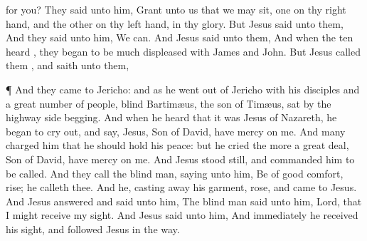 {{{for you?}}
They
said unto
him,
Grant unto
us
that we may
sit,
one
on
thy right
hand,
and the
other
on
thy left
hand,
in
thy
glory.
But
Jesus
said unto
them,
{}
And they
said unto
him, We
can.
And
Jesus
said unto
them,
{}
And
when the
ten
heard
{}, they
began to be much
displeased
with
James
and
John.
But
Jesus
called
them
{}, and
saith unto
them,
{}
\par }{\PP {}¶
And they
came
to
Jericho:
and
as
he went
out
of
Jericho
with
his
disciples
and
a
great number of
people,
blind
Bartimæus, the
son of
Timæus,
sat
by the highway
side
begging.
And when he
heard
that it
was
Jesus of
Nazareth, he
began to cry
out,
and
say,
Jesus,
{}
Son of
David, have mercy
on
me.
And
many
charged
him
that he should hold his
peace:
but he
cried the
more a great
deal,
{}
Son of
David, have mercy
on
me.
And
Jesus stood
still, and
commanded
him to be
called.
And they
call the blind
man,
saying unto
him, Be of good
comfort,
rise; he
calleth
thee.
And he, casting
away
his
garment,
rose, and
came
to
Jesus.
And
Jesus
answered and
said unto
him,
{} The blind
man
said unto
him,
Lord,
that I might receive my
sight.
And
Jesus
said unto
him,
{}
And
immediately he received his
sight,
and
followed
Jesus
in the
way.

}
